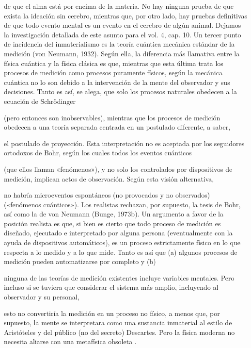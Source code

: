 \begin{justifying}
  de que el alma está por encima de la materia. No hay ninguna prueba de que
  exista la ideación sin cerebro, mientras que, por otro lado, hay pruebas definitivas
  de que todo evento mental es un evento en el cerebro de algún animal. Dejamos
  la investigación detallada de este asunto para el vol. 4, cap. 10.
  Un tercer punto de incidencia del inmaterialismo es la teoría cuántica
  mecánica estándar de la medición (von Neumann, 1932). Según
  ella, la diferencia más llamativa entre la física cuántica y la física clásica
  es que, mientras que esta última trata los procesos de medición como procesos puramente
  físicos, según la mecánica cuántica no lo son
  debido a la intervención de la mente del observador y sus decisiones. Tanto es así, se alega, que solo los procesos naturales obedecen a la ecuación de Schrödinger

  (pero entonces son inobservables), mientras que los procesos de medición
  obedecen a una teoría separada centrada en un postulado diferente, a saber,

  el postulado de proyección. Esta interpretación no es aceptada por los
  seguidores ortodoxos de Bohr, según los cuales todos los eventos cuánticos

  (que ellos llaman «fenómenos»), y no solo los controlados por dispositivos de medición,
  implican actos de observación. Según esta visión alternativa,

  no habría microeventos espontáneos (no provocados y no observados)
  («fenómenos cuánticos»). Los realistas rechazan, por supuesto, la tesis de Bohr,
  así como la de von Neumann (Bunge, 1973b). Un argumento a favor de la
  posición realista es que, si bien es cierto que todo proceso de medición es
    \noindent
  \bigskip
  diseñado, ejecutado e interpretado por alguna persona (eventualmente con la
  ayuda de dispositivos automáticos), es un proceso estrictamente físico en lo que respecta a
  lo medido y a lo que mide. Tanto es así que (a)
  algunos procesos de medición pueden automatizarse por completo y (b)

  ninguna de las teorías de medición existentes incluye variables mentales.
  Pero incluso si se tuviera que considerar el sistema más amplio, incluyendo al observador y su personal,

  esto no convertiría la medición en un proceso no físico,
  a menos que, por supuesto, la mente se interpretara como una sustancia inmaterial
  al estilo de Aristóteles y del público (no del secreto)
  Descartes. Pero la física moderna no necesita aliarse con una metafísica obsoleta
  .
  \noindent
  \vspace{0.3cm}

\end{justifying}
